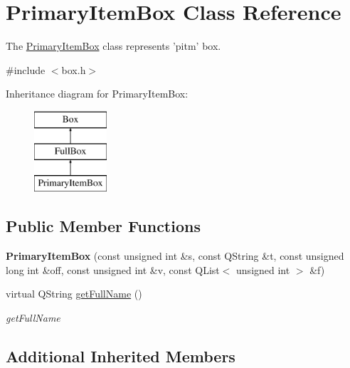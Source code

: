 \hypertarget{class_primary_item_box}{\section{Primary\-Item\-Box Class Reference}
\label{class_primary_item_box}
}


The \hyperlink{class_primary_item_box}{Primary\-Item\-Box} class represents 'pitm' box.  




{\ttfamily \#include $<$box.\-h$>$}

Inheritance diagram for Primary\-Item\-Box\-:\begin{figure}[H]
\begin{center}
\leavevmode
\includegraphics[height=3.000000cm]{class_primary_item_box}
\end{center}
\end{figure}
\subsection*{Public Member Functions}
\begin{DoxyCompactItemize}
\item 
\hypertarget{class_primary_item_box_ab9c4c98cff888ed8ef48d85a93dcc610}{{\bfseries Primary\-Item\-Box} (const unsigned int \&s, const Q\-String \&t, const unsigned long int \&off, const unsigned int \&v, const Q\-List$<$ unsigned int $>$ \&f)}\label{class_primary_item_box_ab9c4c98cff888ed8ef48d85a93dcc610}

\item 
virtual Q\-String \hyperlink{class_primary_item_box_a77154a0294bff85067fc8c6cddecb8f1}{get\-Full\-Name} ()
\begin{DoxyCompactList}\small\item\em get\-Full\-Name \end{DoxyCompactList}\end{DoxyCompactItemize}
\subsection*{Additional Inherited Members}


